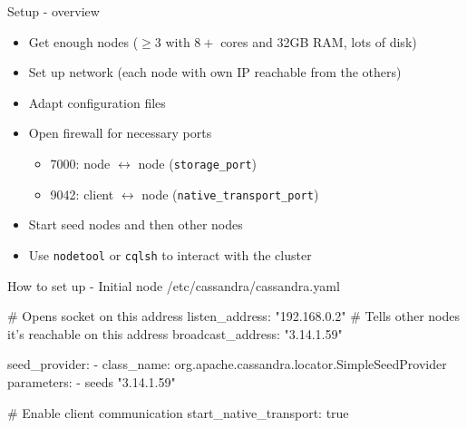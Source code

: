 \documentclass[10pt]{beamer}
\begin{document}
\begin{frame}{Setup - overview}
  \begin{itemize}
    \item Get enough nodes ($\geq3$ with $8+$ cores and 32GB RAM, lots of disk)
    \item Set up network (each node with own IP reachable from the others)
    \item Adapt configuration files
    \item Open firewall for necessary ports
    \begin{itemize}
      \item 7000: node $\leftrightarrow$ node (\lstinline{storage_port})
      \item 9042: client $\leftrightarrow$ node (\lstinline{native_transport_port})
    \end{itemize}
    \item Start seed nodes and then other nodes
    \item Use \lstinline{nodetool} or \lstinline{cqlsh} to interact with the cluster
  \end{itemize}
\end{frame}

\begin{frame}[fragile]{How to set up - Initial node}
/etc/cassandra/cassandra.yaml
\begin{semiverbatim}
# Opens socket on this address
listen_address: "192.168.0.2"
# Tells other nodes it's reachable on this address
broadcast_address: "3.14.1.59"

seed_provider:
  - class_name: org.apache.cassandra.locator.SimpleSeedProvider
    parameters:
      - seeds "3.14.1.59"

# Enable client communication
start_native_transport: true
\end{semiverbatim}
\end{frame}
\end{document}
